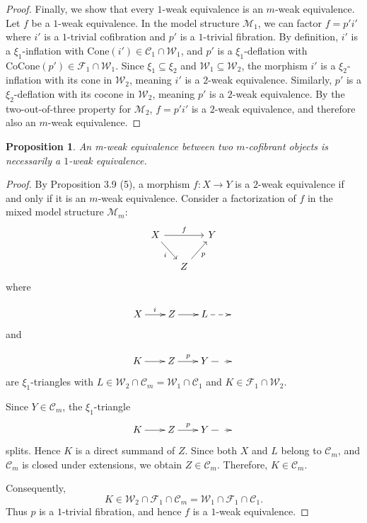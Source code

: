 \documentclass[11pt,a4paper]{amsart}
\numberwithin{equation}{section}
\theoremstyle{plain}
\newtheorem{prop}[thm]{Proposition}
\begin{document}
\begin{proof}
	
	Finally, we show that every $1$-weak equivalence is an $m$-weak equivalence. Let $f$ be a $1$-weak equivalence. In the model structure $\mathcal{M}_1$, we can factor $f = p'i'$ where $i'$ is a $1$-trivial cofibration and $p'$ is a $1$-trivial fibration. By definition, $i'$ is a $\xi_1$-inflation with $\mathrm{Cone}(i') \in \mathcal{C}_1 \cap \mathcal{W}_1$, and $p'$ is a $\xi_1$-deflation with $\mathrm{CoCone}(p') \in \mathcal{F}_1 \cap \mathcal{W}_1$. Since $\xi_1 \subseteq \xi_2$ and $\mathcal{W}_1 \subseteq \mathcal{W}_2$, the morphism $i'$ is a $\xi_2$-inflation with its cone in $\mathcal{W}_2$, meaning $i'$ is a $2$-weak equivalence. Similarly, $p'$ is a $\xi_2$-deflation with its cocone in $\mathcal{W}_2$, meaning $p'$ is a $2$-weak equivalence. By the two-out-of-three property for $\mathcal{M}_2$, $f = p'i'$ is a $2$-weak equivalence, and therefore also an $m$-weak equivalence.
	
	
	
\end{proof}




\begin{prop}
	An m-weak equivalence between two $m$-cofibrant objects is necessarily a $1$-weak equivalence.
\end{prop}

\begin{proof}
	By Proposition 3.9 (5), a morphism
	\(
	f:X\to Y
	\)
	is a $2$-weak equivalence if and only if it is an $m$-weak equivalence. Consider a factorization of \(f\) in the mixed model structure \(\mathcal{M}_m\):
	\[
	\begin{tikzcd}[column sep=small]
		X \arrow[rr,"f"] \arrow[dr,"i"']
		&& Y \\
		& Z \arrow[ur,"p"'] &
	\end{tikzcd}
	\]
	where
	
	\[
	\xymatrix@C=2em{
		X  \ar[r]^i &
		Z \ar[r] &
		L\ar@{-->}[r] &
		{}
	}
	\]
	and
	
	\[
	\xymatrix@C=2em{
		K \ar[r] &
		Z \ar[r]^p &
		Y\ar@{-->}[r] &
		{}
	}
	\]
	are \(\xi_1\)-triangles with
	\(
	L\in\mathcal{W}_2\cap\mathcal{C}_m
	=
	\mathcal{W}_1\cap\mathcal{C}_1
	\)
	and
	\(
	K\in\mathcal{F}_1\cap\mathcal{W}_2.
	\)
	
	Since \(Y\in\mathcal{C}_m\), the $\xi_1$-triangle
	\[
\xymatrix@C=2em{
	K \ar[r] &
	Z \ar[r]^p &
	Y\ar@{-->}[r] &
	{}
}
\]
	splits. Hence \(K\) is a direct summand of \(Z\). Since both \(X\) and \(L\) belong to \(\mathcal{C}_m\), and \(\mathcal{C}_m\) is closed under extensions, we obtain
	\(
	Z\in\mathcal{C}_m.
	\)
	Therefore,
	\(
	K\in\mathcal{C}_m.
	\)
	
	Consequently,
	\[
	K\in
	\mathcal{W}_2\cap\mathcal{F}_1\cap\mathcal{C}_m
	=
	\mathcal{W}_1\cap\mathcal{F}_1\cap\mathcal{C}_1.
	\]
	Thus \(p\) is a $1$-trivial fibration, and hence \(f\) is a $1$-weak equivalence.
\end{proof}
\end{document}
